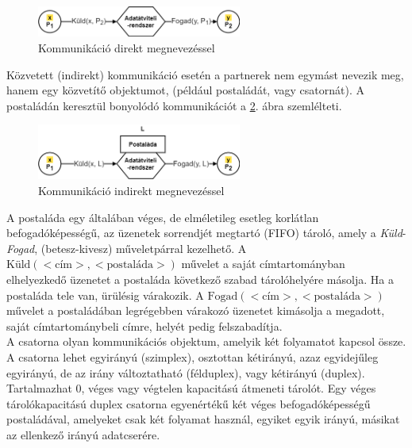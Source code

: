 \documentclass[tikz,12pt,margin=0px]{article}
\begin{document}
    \begin{figure}[H]
        \centering
        \includegraphics[width=0.6\textwidth]{img/direct_communication.png}
        \caption{Kommunikáció direkt megnevezéssel}
        \label{direct_communication}
    \end{figure}

    \noindent Közvetett (indirekt) kommunikáció esetén a partnerek nem egymást nevezik meg, hanem egy közvetítő objektumot, (például postaládát, vagy csatornát). A postaládán keresztül bonyolódó kommunikációt a \ref{indirect_communication}. ábra szemlélteti.

    \begin{figure}[H]
        \centering
        \includegraphics[width=0.6\textwidth]{img/indirect_communication.png}
        \caption{Kommunikáció indirekt megnevezéssel}
        \label{indirect_communication}
    \end{figure}

    \noindent A postaláda egy általában véges, de elméletileg esetleg korlátlan befogadóképességű, az üzenetek sorrendjét megtartó (FIFO) tároló, amely a \emph{Küld}-\emph{Fogad}, (betesz-kivesz) műveletpárral kezelhető. A $\text{Küld}(<\text{cím}>,<\text{postaláda}>)$ művelet a saját címtartományban elhelyezkedő üzenetet a postaláda következő szabad tárolóhelyére másolja. Ha a postaláda tele van, ürülésig várakozik. A $\text{Fogad}(<\text{cím}>,<\text{postaláda}>)$ művelet a postaládában legrégebben várakozó üzenetet kimásolja a megadott, saját címtartománybeli címre, helyét pedig felszabadítja.\\

    \noindent A csatorna olyan kommunikációs objektum, amelyik két folyamatot kapcsol össze. A csatorna lehet egyirányú (szimplex), osztottan kétirányú, azaz egyidejűleg egyirányú, de az irány változtatható (félduplex), vagy kétirányú (duplex). Tartalmazhat 0, véges vagy végtelen kapacitású átmeneti tárolót. Egy véges tárolókapacitású duplex csatorna egyenértékű két véges befogadóképességű postaládával, amelyeket csak két folyamat használ, egyiket egyik irányú, másikat az ellenkező irányú adatcserére.\\
\end{document}

